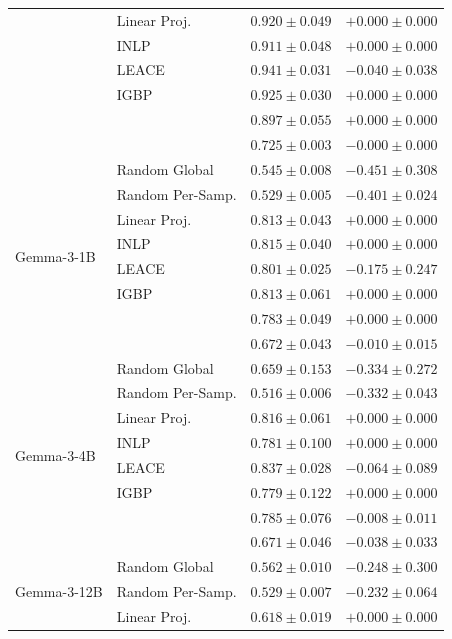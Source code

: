 \begin{longtable}{ll rr}
   & Linear Proj. & $0.920{\pm}0.049$ & $+0.000{\pm}0.000$ \\
   & INLP & $0.911{\pm}0.048$ & $+0.000{\pm}0.000$ \\
   & LEACE & $0.941{\pm}0.031$ & $-0.040{\pm}0.038$ \\
   & IGBP & $0.925{\pm}0.030$ & $+0.000{\pm}0.000$ \\
   & \AmbGCE{} & $0.897{\pm}0.055$ & $+0.000{\pm}0.000$ \\
   & \TanGCE{} & \textbf{$0.725{\pm}0.003$} & $-0.000{\pm}0.000$ \\
  \midrule
  \multirow{8}{*}{Gemma-3-1B} & Random Global & $0.545{\pm}0.008$ & $-0.451{\pm}0.308$ \\
   & Random Per-Samp. & $0.529{\pm}0.005$ & $-0.401{\pm}0.024$ \\
   & Linear Proj. & $0.813{\pm}0.043$ & $+0.000{\pm}0.000$ \\
   & INLP & $0.815{\pm}0.040$ & $+0.000{\pm}0.000$ \\
   & LEACE & $0.801{\pm}0.025$ & $-0.175{\pm}0.247$ \\
   & IGBP & $0.813{\pm}0.061$ & $+0.000{\pm}0.000$ \\
   & \AmbGCE{} & $0.783{\pm}0.049$ & $+0.000{\pm}0.000$ \\
   & \TanGCE{} & \textbf{$0.672{\pm}0.043$} & $-0.010{\pm}0.015$ \\
  \midrule
  \multirow{8}{*}{Gemma-3-4B} & Random Global & $0.659{\pm}0.153$ & $-0.334{\pm}0.272$ \\
   & Random Per-Samp. & $0.516{\pm}0.006$ & $-0.332{\pm}0.043$ \\
   & Linear Proj. & $0.816{\pm}0.061$ & $+0.000{\pm}0.000$ \\
   & INLP & $0.781{\pm}0.100$ & $+0.000{\pm}0.000$ \\
   & LEACE & $0.837{\pm}0.028$ & $-0.064{\pm}0.089$ \\
   & IGBP & $0.779{\pm}0.122$ & $+0.000{\pm}0.000$ \\
   & \AmbGCE{} & $0.785{\pm}0.076$ & $-0.008{\pm}0.011$ \\
   & \TanGCE{} & \textbf{$0.671{\pm}0.046$} & $-0.038{\pm}0.033$ \\
  \midrule
  \multirow{8}{*}{Gemma-3-12B} & Random Global & $0.562{\pm}0.010$ & $-0.248{\pm}0.300$ \\
   & Random Per-Samp. & $0.529{\pm}0.007$ & $-0.232{\pm}0.064$ \\
   & Linear Proj. & $0.618{\pm}0.019$ & $+0.000{\pm}0.000$ \\

\end{longtable}
